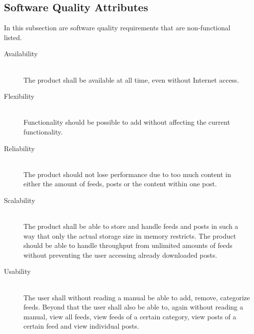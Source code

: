 \subsection{Software Quality Attributes}
In this subsection are software quality requirements that are non-functional listed.
\begin{description}
  \item[Availability] \hfill \\
The product shall be available at all time, even without Internet access.
  \item[Flexibility] \hfill \\
Functionality should be possible to add without affecting the current functionality.
  \item[Reliability] \hfill \\
The product should not lose performance due to too much content in either the amount of feeds, posts or the content within one post.
  \item[Scalability] \hfill \\
The product shall be able to store and handle feeds and posts in such a way that only the actual storage size in memory restricts. The product should be able to handle throughput from unlimited amounts of feeds without preventing the user accessing already downloaded posts.
  \item[Usability] \hfill \\
The user shall without reading a manual be able to add, remove, categorize feeds. Beyond that the user shall also be able to, again without reading a manual, view all feeds, view feeds of a certain category, view posts of a certain feed and view individual posts.
\end{description}
